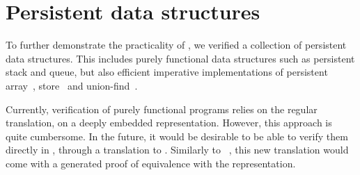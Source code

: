 \section{Persistent data structures}
\label{sec:persistent}

To further demonstrate the practicality of \Zoo, we verified a collection of persistent data structures.
This includes purely functional data structures such as persistent stack and queue, but also efficient imperative implementations of persistent array~\citep*{DBLP:conf/ml/ConchonF07}, store~\citep*{DBLP:journals/pacmpl/AllainC0S24} and union-find~\citep*{DBLP:journals/pacmpl/AllainC0S24}.

Currently, verification of purely functional programs relies on the regular \ZooLang translation, \ie on a deeply embedded representation.
However, this approach is quite cumbersome.
In the future, it would be desirable to be able to verify them directly in \Rocq, through a translation to \Gallina.
Similarly to \Hacspec~\citep*{DBLP:conf/cpp/HaselwarterHHWH24}, this new translation would come with a generated proof of equivalence with the \ZooLang representation.